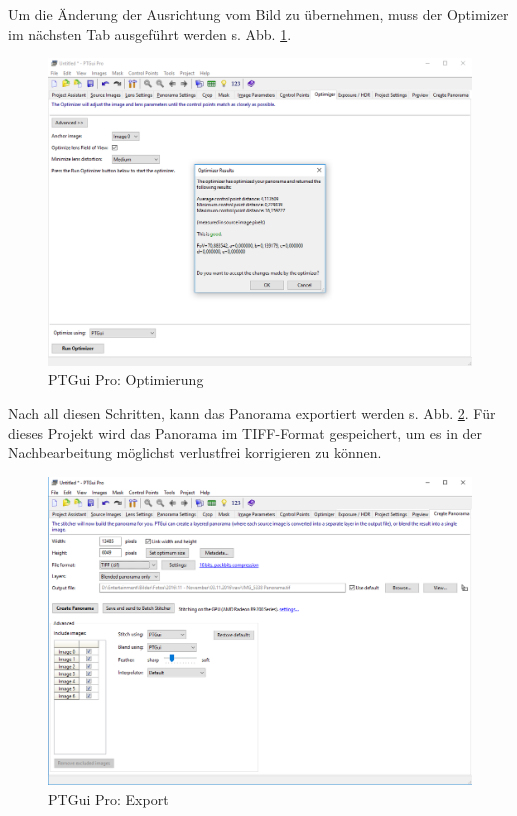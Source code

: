 \documentclass[liststotoc,bibtotoc,fontsize=14pt,]{scrreprt}
\begin{document}
	\bigskip
	Um die Änderung der Ausrichtung vom Bild zu übernehmen, muss der \grqq{}Optimizer\grqq{} im nächsten Tab ausgeführt werden s. Abb. \ref{img:ptgui_step_6}.
	\begin{figure}[H]
		\includegraphics[width=\linewidth]{img/steps/PTGui_Step_6.PNG}
		\caption{PTGui Pro: Optimierung}
		\label{img:ptgui_step_6}
	\end{figure}
	\bigskip
	Nach all diesen Schritten, kann das Panorama exportiert werden s. Abb. \ref{img:ptgui_step_7}. Für dieses Projekt wird das Panorama im TIFF-Format gespeichert, um es in der Nachbearbeitung möglichst verlustfrei korrigieren zu können.
	\begin{figure}[H]
		\includegraphics[width=\linewidth]{img/steps/PTGui_Step_7.PNG}
		\caption{PTGui Pro: Export}
		\label{img:ptgui_step_7}
	\end{figure}
	
\end{document}
